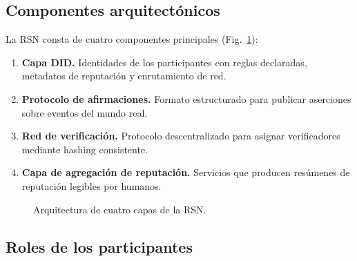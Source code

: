\documentclass[11pt,a4paper,twocolumn]{article}
\begin{document}
\subsection{Componentes arquitectónicos}

La RSN consta de cuatro componentes principales (Fig.~\ref{fig:architecture}):
\begin{enumerate}[nosep]
\item \textbf{Capa DID.} Identidades de los participantes con reglas declaradas, metadatos de reputación y enrutamiento de red.
\item \textbf{Protocolo de afirmaciones.} Formato estructurado para publicar aserciones sobre eventos del mundo real.
\item \textbf{Red de verificación.} Protocolo descentralizado para asignar verificadores mediante hashing consistente.
\item \textbf{Capa de agregación de reputación.} Servicios que producen resúmenes de reputación legibles por humanos.
\end{enumerate}

\begin{figure}[ht]
\centering
{}
\caption{Arquitectura de cuatro capas de la RSN.}
\label{fig:architecture}
\end{figure}

\subsection{Roles de los participantes}
\end{document}
